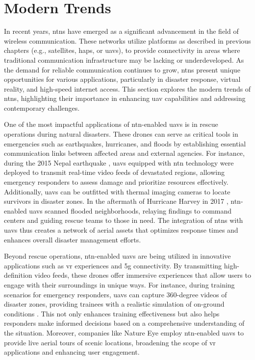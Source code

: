 \chapter{Modern Trends}\label{ch:modern_trends}

In recent years, \glspl{ntn} have emerged as a significant advancement in the field of wireless communication. These networks utilize platforms as described in previous chapters (e.g., satellites, \glspl{hap}, or \glspl{uav}), to provide connectivity in areas where traditional communication infrastructure may be lacking or underdeveloped. As the demand for reliable communication continues to grow, \glspl{ntn} present unique opportunities for various applications, particularly in disaster response, virtual reality, and high-speed internet access. This section explores the modern trends of \glspl{ntn}, highlighting their importance in enhancing \gls{uav} capabilities and addressing contemporary challenges.

One of the most impactful applications of \gls{ntn}-enabled \glspl{uav} is in rescue operations during natural disasters. These drones can serve as critical tools in emergencies such as earthquakes, hurricanes, and floods by establishing essential communication links between affected areas and external agencies. For instance, during the 2015 Nepal earthquake \autocite{drone_nepal_2015}, \glspl{uav} equipped with \gls{ntn} technology were deployed to transmit real-time video feeds of devastated regions, allowing emergency responders to assess damage and prioritize resources effectively. Additionally, \glspl{uav} can be outfitted with thermal imaging cameras to locate survivors in disaster zones. In the aftermath of Hurricane Harvey in 2017 \autocite{Greenwood2020FlyingIT}, \gls{ntn}-enabled \glspl{uav} scanned flooded neighborhoods, relaying findings to command centers and guiding rescue teams to those in need. The integration of \glspl{ntn} with \glspl{uav} thus creates a network of aerial assets that optimizes response times and enhances overall disaster management efforts.

Beyond rescue operations, \gls{ntn}-enabled \glspl{uav} are being utilized in innovative applications such as \gls{vr} experiences and \gls{5g} connectivity. By transmitting high-definition video feeds, these drones offer immersive experiences that allow users to engage with their surroundings in unique ways. For instance, during training scenarios for emergency responders, \glspl{uav} can capture 360-degree videos of disaster zones, providing trainees with a realistic simulation of on-ground conditions \autocite{vr_model_drone_footage_disaster_zone}. This not only enhances training effectiveness but also helps responders make informed decisions based on a comprehensive understanding of the situation. Moreover, companies like Nature Eye \autocite{natureeyeNatureEyeExplore} employ \gls{ntn}-enabled \glspl{uav} to provide live aerial tours of scenic locations, broadening the scope of \gls{vr} applications and enhancing user engagement.

